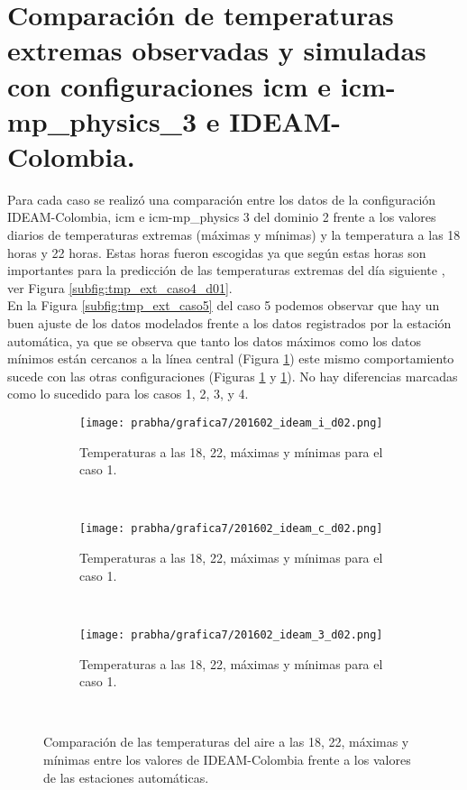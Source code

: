 \section{Comparación de temperaturas extremas observadas y simuladas con configuraciones icm e icm-mp\_physics\_3 e IDEAM-Colombia.}

Para cada caso se realizó una comparación entre los datos de la configuración IDEAM-Colombia, icm e icm-mp\_physics 3 del dominio 2 frente a los valores diarios de temperaturas extremas (máximas y mínimas) y la temperatura a las 18 horas y 22 horas. Estas horas fueron escogidas ya que según \citet{snyder2005frost,} estas horas son importantes para la predicción de las temperaturas extremas del día siguiente \citet{prabha2008}, ver Figura \ref{subfig:tmp_ext_caso4_d01}.\\

En la Figura \ref{subfig:tmp_ext_caso5} del caso 5 podemos observar que hay un buen ajuste de los datos modelados frente a los datos registrados por la estación automática, ya que se observa que tanto los datos máximos como los datos mínimos están cercanos a la línea central (Figura \ref{subfig:tmp_ext_caso5_1}) este mismo comportamiento sucede con las otras configuraciones (Figuras \ref{subfig:tmp_ext_caso5_1} y \ref{subfig:tmp_ext_caso5_1}). No hay diferencias marcadas como lo sucedido para los casos 1, 2, 3, y 4.\\


\begin{figure}[H]
    \centering
    \begin{subfigure}[b]{0.45\textwidth}
        \caption{Temperaturas a las 18, 22, máximas y mínimas para el caso 1.}
	\texttt{[image: prabha/grafica7/201602\_ideam\_i\_d02.png]}
    \label{subfig:tmp_ext_caso5_1}
	\end{subfigure}
	~
	    \begin{subfigure}[b]{0.45\textwidth}
        \caption{Temperaturas a las 18, 22, máximas y mínimas para el caso 1.}
	\texttt{[image: prabha/grafica7/201602\_ideam\_c\_d02.png]}

    \label{subfig:tmp_ext_caso5_2}
	\end{subfigure}
	~
	\centering
	    \begin{subfigure}[b]{0.45\textwidth}
        \caption{Temperaturas a las 18, 22, máximas y mínimas para el caso 1.}
	\texttt{[image: prabha/grafica7/201602\_ideam\_3\_d02.png]}
    \label{subfig:tmp_ext_caso5_3}
	\end{subfigure}
	~
	
\caption{Comparación de las temperaturas del aire a las 18, 22, máximas y mínimas entre los valores de IDEAM-Colombia frente a los valores de las estaciones automáticas.}	
\label{subfig:tmp_ext_caso6}	
\end{figure}

